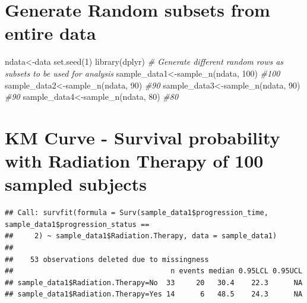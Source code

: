 \documentclass[
  11pt,
]{article}
\newenvironment{Shaded}{\begin{snugshade}}{\end{snugshade}}
\newcommand{\AttributeTok}[1]{\textcolor[rgb]{0.77,0.63,0.00}{#1}}
\newcommand{\CommentTok}[1]{\textcolor[rgb]{0.56,0.35,0.01}{\textit{#1}}}
\newcommand{\DecValTok}[1]{\textcolor[rgb]{0.00,0.00,0.81}{#1}}
\newcommand{\FunctionTok}[1]{\textcolor[rgb]{0.00,0.00,0.00}{#1}}
\newcommand{\NormalTok}[1]{#1}
\newcommand{\OtherTok}[1]{\textcolor[rgb]{0.56,0.35,0.01}{#1}}
\newcommand{\SpecialCharTok}[1]{\textcolor[rgb]{0.00,0.00,0.00}{#1}}
\newcommand{\StringTok}[1]{\textcolor[rgb]{0.31,0.60,0.02}{#1}}
\begin{document}
\newpage
\section{Generate Random subsets from entire data}

\begin{Shaded}
\begin{Highlighting}[]
\NormalTok{ndata}\OtherTok{\textless{}{-}}\NormalTok{data}
\FunctionTok{set.seed}\NormalTok{(}\DecValTok{1}\NormalTok{)}
\FunctionTok{library}\NormalTok{(dplyr)}
\CommentTok{\# Generate different random rows as subsets to be used for analysis  }
\NormalTok{ sample\_data1}\OtherTok{\textless{}{-}}\FunctionTok{sample\_n}\NormalTok{(ndata, }\DecValTok{100}\NormalTok{) }\CommentTok{\#100   }
\NormalTok{ sample\_data2}\OtherTok{\textless{}{-}}\FunctionTok{sample\_n}\NormalTok{(ndata, }\DecValTok{90}\NormalTok{) }\CommentTok{\#90}
\NormalTok{ sample\_data3}\OtherTok{\textless{}{-}}\FunctionTok{sample\_n}\NormalTok{(ndata, }\DecValTok{90}\NormalTok{) }\CommentTok{\#90}
\NormalTok{ sample\_data4}\OtherTok{\textless{}{-}}\FunctionTok{sample\_n}\NormalTok{(ndata, }\DecValTok{80}\NormalTok{) }\CommentTok{\#80}
\end{Highlighting}
\end{Shaded}

\newpage
\section{KM Curve - Survival probability with Radiation Therapy of 100 sampled subjects}

\begin{Shaded}
\end{Shaded}

\begin{verbatim}
## Call: survfit(formula = Surv(sample_data1$progression_time, sample_data1$progression_status == 
##     2) ~ sample_data1$Radiation.Therapy, data = sample_data1)
## 
##    53 observations deleted due to missingness 
##                                     n events median 0.95LCL 0.95UCL
## sample_data1$Radiation.Therapy=No  33     20   30.4    22.3      NA
## sample_data1$Radiation.Therapy=Yes 14      6   48.5    24.3      NA
\end{verbatim}
\end{document}
